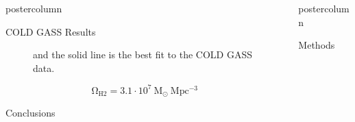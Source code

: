 \documentclass{beamer}
\newlength{\columnheight}
\begin{document}
\begin{frame}
\begin{columns}
\begin{column}{.5\textwidth}
\begin{beamercolorbox}[center,wd=\textwidth]{postercolumn}
\begin{minipage}[T]{.95\textwidth}
{\begin{myblock}{\LARGE COLD GASS Results}
\begin{figure}[H]
{							and the solid line is the best fit to the COLD GASS data.}
						  \label{fig:2013GasFraction}
						\end{figure}
						\begin{equation}
							\mathrm{\Omega_{H2} = 3.1 \cdot 10^{7} ~ M_{\odot}~ Mpc^{-3}}
						\end{equation}
					\end{myblock}\vfill
\begin{myblock}{\LARGE Conclusions}
\end{myblock}\vfill
		}\end{minipage}\end{beamercolorbox}
	\end{column}
	\begin{column}{.5\textwidth}
		\begin{beamercolorbox}[center,wd=\textwidth]{postercolumn}
			\begin{minipage}[T]{.95\textwidth} %
				\parbox[t][\columnheight]{\textwidth}{ %
					\begin{myblock}{\LARGE Methods}


\end{myblock}}
\end{minipage}
\end{beamercolorbox}
\end{column}
\end{columns}
\end{frame}
\end{document}
